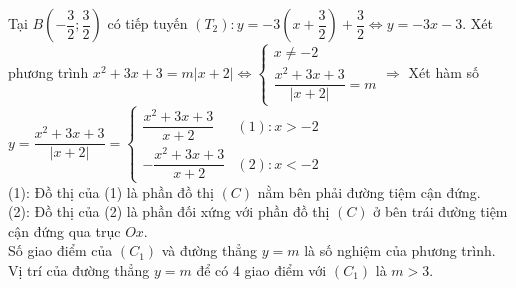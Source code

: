 \begin{ex}
{\begin{itemchoice}
	Tại $B\left(-\dfrac{3}{2};\dfrac{3}{2}\right)$  có tiếp tuyến $(T_2): y=-3\left(x+\dfrac{3}{2}\right)+\dfrac{3}{2}\Leftrightarrow y=-3x-3$.
	\itemch Xét phương trình $x^2+3x+3=m|x+2|\Leftrightarrow\begin{cases}x\ne-2\\\dfrac{x^2+3x+3}{|x+2|}=m
	\end{cases}\Rightarrow$
	Xét hàm số $y=\dfrac{x^2+3x+3}{|x+2|}=\begin{cases}\dfrac{x^2+3x+3}{x+2}&(1): x>-2\\-\dfrac{x^2+3x+3}{x+2}&(2): x<-2
	\end{cases}$\\
	(1): Đồ thị của (1) là phần đồ thị  $(C)$ nằm bên phải đường tiệm cận đứng.\\
	(2): Đồ thị của (2) là phần đối xứng với phần đồ thị $(C)$ ở bên trái đường tiệm cận đứng qua trục $Ox$.\\ 
	Số giao điểm của  $(C_1)$ và đường thẳng $y=m$ là số nghiệm của phương trình.\\
	Vị  trí của đường thẳng $y=m$ để có 4 giao điểm với $(C_1)$ là $m>3$.
	\end{itemchoice}
} 
\end{ex}

